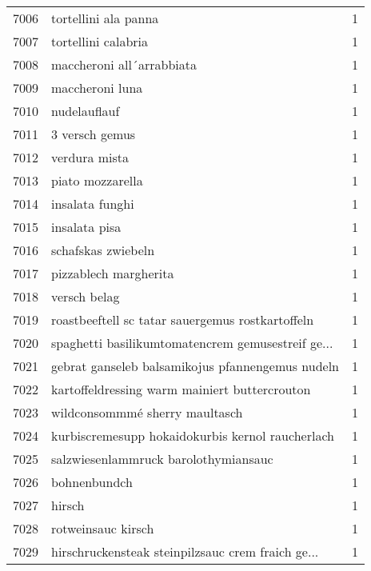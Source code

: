 \begin{tabular}{llr}
7006 &                               tortellini ala panna &      1 \\
7007 &                                tortellini calabria &      1 \\
7008 &                          maccheroni all´arrabbiata &      1 \\
7009 &                                    maccheroni luna &      1 \\
7010 &                                       nudelauflauf &      1 \\
7011 &                                     3 versch gemus &      1 \\
7012 &                                      verdura mista &      1 \\
7013 &                                   piato mozzarella &      1 \\
7014 &                                    insalata funghi &      1 \\
7015 &                                      insalata pisa &      1 \\
7016 &                                 schafskas zwiebeln &      1 \\
7017 &                              pizzablech margherita &      1 \\
7018 &                                       versch belag &      1 \\
7019 &   roastbeeftell sc tatar sauergemus rostkartoffeln &      1 \\
7020 &  spaghetti basilikumtomatencrem gemusestreif ge... &      1 \\
7021 &   gebrat ganseleb balsamikojus pfannengemus nudeln &      1 \\
7022 &      kartoffeldressing warm mainiert buttercrouton &      1 \\
7023 &                     wildconsommmé sherry maultasch &      1 \\
7024 &   kurbiscremesupp hokaidokurbis kernol raucherlach &      1 \\
7025 &               salzwiesenlammruck barolothymiansauc &      1 \\
7026 &                                       bohnenbundch &      1 \\
7027 &                                             hirsch &      1 \\
7028 &                                 rotweinsauc kirsch &      1 \\
7029 &  hirschruckensteak steinpilzsauc crem fraich ge... &      1 \\

\end{tabular}
